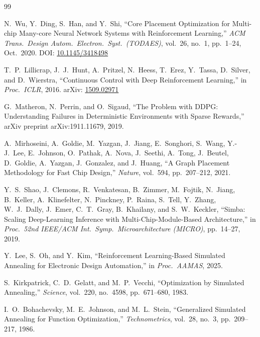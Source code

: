 \documentclass[10pt,conference]{IEEEtran}
\begin{document}

\begin{thebibliography}{99}

N.~Wu, Y.~Ding, S.~Han, and Y.~Shi,
``Core Placement Optimization for Multi-chip Many-core Neural Network Systems
  with Reinforcement Learning,''
\emph{ACM Trans.\ Design Autom.\ Electron.\ Syst.\ (TODAES)},
vol.~26, no.~1, pp.~1--24, Oct.\ 2020.
DOI: \href{https://doi.org/10.1145/3418498}{10.1145/3418498}

T.~P.~Lillicrap, J.~J.~Hunt, A.~Pritzel, N.~Heess, T.~Erez, Y.~Tassa,
D.~Silver, and D.~Wierstra,
``Continuous Control with Deep Reinforcement Learning,''
in \emph{Proc.\ ICLR}, 2016.
arXiv: \href{https://arxiv.org/abs/1509.02971}{1509.02971}

G.~Matheron, N.~Perrin, and O.~Sigaud,
``The Problem with DDPG: Understanding Failures in Deterministic Environments
  with Sparse Rewards,''
arXiv preprint arXiv:1911.11679, 2019.

A.~Mirhoseini, A.~Goldie, M.~Yazgan, J.~Jiang, E.~Songhori, S.~Wang,
Y.-J.~Lee, E.~Johnson, O.~Pathak, A.~Nova, J.~Seethi, A.~Tong, J.~Beutel,
D.~Goldie, A.~Yazgan, J.~Gonzalez, and J.~Huang,
``A Graph Placement Methodology for Fast Chip Design,''
\emph{Nature}, vol.~594, pp.~207--212, 2021.

Y.~S.~Shao, J.~Clemons, R.~Venkatesan, B.~Zimmer, M.~Fojtik, N.~Jiang,
B.~Keller, A.~Klinefelter, N.~Pinckney, P.~Raina, S.~Tell, Y.~Zhang,
W.~J.~Dally, J.~Emer, C.~T.~Gray, B.~Khailany, and S.~W.~Keckler,
``Simba: Scaling Deep-Learning Inference with Multi-Chip-Module-Based
  Architecture,''
in \emph{Proc.\ 52nd IEEE/ACM Int.\ Symp.\ Microarchitecture (MICRO)},
pp.~14--27, 2019.

Y.~Lee, S.~Oh, and Y.~Kim,
``Reinforcement Learning-Based Simulated Annealing for Electronic Design
  Automation,''
in \emph{Proc.\ AAMAS}, 2025.

S.~Kirkpatrick, C.~D.~Gelatt, and M.~P.~Vecchi,
``Optimization by Simulated Annealing,''
\emph{Science}, vol.~220, no.~4598, pp.~671--680, 1983.

I.~O.~Bohachevsky, M.~E.~Johnson, and M.~L.~Stein,
``Generalized Simulated Annealing for Function Optimization,''
\emph{Technometrics}, vol.~28, no.~3, pp.~209--217, 1986.


\end{thebibliography}
\end{document}
